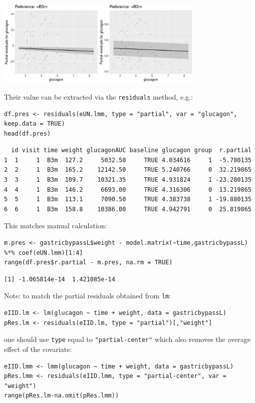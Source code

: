 \documentclass[12pt]{article}
\begin{document}
\begin{center}
\includegraphics[width=0.75\textwidth]{./figures/fit-pres.pdf}
\end{center}

Their value can be extracted via the \texttt{residuals} method, e.g.:
\lstset{language=r,label= ,caption= ,captionpos=b,numbers=none}
\begin{lstlisting}
df.pres <- residuals(eUN.lmm, type = "partial", var = "glucagon", keep.data = TRUE)
head(df.pres)
\end{lstlisting}

\begin{verbatim}
  id visit time weight glucagonAUC baseline glucagon group  r.partial
1  1     1  B3m  127.2     5032.50     TRUE 4.034616     1  -5.780135
2  2     1  B3m  165.2    12142.50     TRUE 5.240766     0  32.219865
3  3     1  B3m  109.7    10321.35     TRUE 4.931824     1 -23.280135
4  4     1  B3m  146.2     6693.00     TRUE 4.316306     0  13.219865
5  5     1  B3m  113.1     7090.50     TRUE 4.383738     1 -19.880135
6  6     1  B3m  158.8    10386.00     TRUE 4.942791     0  25.819865
\end{verbatim}


This matches manual calculation:
\lstset{language=r,label= ,caption= ,captionpos=b,numbers=none}
\begin{lstlisting}
m.pres <- gastricbypassL$weight - model.matrix(~time,gastricbypassL) %*% coef(eUN.lmm)[1:4]
range(df.pres$r.partial - m.pres, na.rm = TRUE)
\end{lstlisting}

\begin{verbatim}
[1] -1.065814e-14  1.421085e-14
\end{verbatim}


Note: to match the partial residuals obtained from \texttt{lm}:
\lstset{language=r,label= ,caption= ,captionpos=b,numbers=none}
\begin{lstlisting}
eIID.lm <- lm(glucagon ~ time + weight, data = gastricbypassL)
pRes.lm <- residuals(eIID.lm, type = "partial")[,"weight"]
\end{lstlisting}
one should use \texttt{type} equal to \texttt{"partial-center"} which also removes
the average effect of the covariate:
\lstset{language=r,label= ,caption= ,captionpos=b,numbers=none}
\begin{lstlisting}
eIID.lmm <- lmm(glucagon ~ time + weight, data = gastricbypassL)
pRes.lmm <- residuals(eIID.lmm, type = "partial-center", var = "weight")
range(pRes.lm-na.omit(pRes.lmm))
\end{lstlisting}
\end{document}
